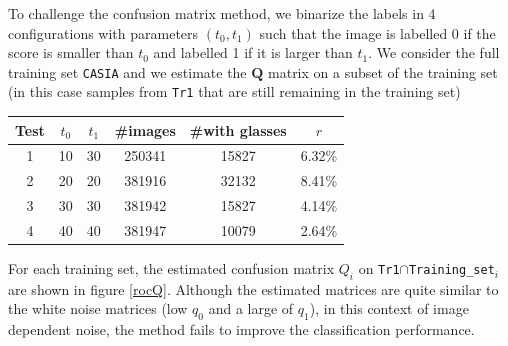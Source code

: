 \documentclass[a4paper]{article}
\newcommand{\Q}{\mathbf{Q}}
\begin{document}
            To challenge the confusion matrix method, we binarize the labels in 4 configurations with parameters $(t_0,t_1)$ such that the image is labelled 0 if the score is smaller than $t_0$ and labelled 1 if it is larger than $t_1$. We consider the full training set \texttt{CASIA} and we estimate the $\Q$ matrix on a subset of the training set (in this case samples from \texttt{Tr1} that are still remaining in the training set)
            \begin{table}[H]
            \centering
            \begin{tabular}{|c|c|c|c|c|c|}
            \hline
            Test & $t_0$ & $t_1$ & \#images & \#with glasses & $r$\\
            \hline
            1 & 10  & 30 & 250341 & 15827 & 6.32\%\\
            2 & 20  & 20 & 381916 & 32132 & 8.41\%\\
            3 & 30  & 30 & 381942 & 15827 & 4.14\%\\
            4 & 40  & 40 & 381947 & 10079 & 2.64\% \\
            \hline
            \end{tabular}
            \end{table}
            For each training set, the estimated confusion matrix $Q_i$ on \texttt{Tr1}$\cap$\texttt{Training\_set}$_i$ are shown in figure \ref{rocQ}. Although the estimated matrices are quite similar to the white noise matrices (low $q_0$ and a large of $q_1$), in this context of image dependent noise, the method fails to improve the classification performance.
\end{document}
